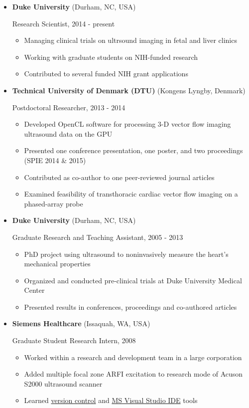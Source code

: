 \documentclass[
]{article}
\providecommand{\tightlist}{%
  \setlength{\itemsep}{0pt}\setlength{\parskip}{0pt}}
\begin{document}
\begin{itemize}
\item
  \textbf{Duke University} (Durham, NC, USA)

  Research Scientist, 2014 - present

  \begin{itemize}
  \tightlist
  \item
    Managing clinical trials on ultrsound imaging in fetal and liver
    clinics
  \item
    Working with graduate students on NIH-funded research
  \item
    Contributed to several funded NIH grant applications
  \end{itemize}
\item
  \textbf{Technical University of Denmark (DTU)} (Kongens Lyngby,
  Denmark)

  Postdoctoral Researcher, 2013 - 2014

  \begin{itemize}
  \tightlist
  \item
    Developed OpenCL software for processing 3-D vector flow imaging
    ultrasound data on the GPU
  \item
    Presented one conference presentation, one poster, and two
    proceedings (SPIE 2014 \& 2015)
  \item
    Contributed as co-author to one peer-reviewed journal articles
  \item
    Examined feasibility of transthoracic cardiac vector flow imaging on
    a phased-array probe
  \end{itemize}
\item
  \textbf{Duke University} (Durham, NC, USA)

  Graduate Research and Teaching Assistant, 2005 - 2013

  \begin{itemize}
  \tightlist
  \item
    PhD project using ultrasound to noninvasively measure the heart's
    mechanical properties
  \item
    Organized and conducted pre-clinical trials at Duke University
    Medical Center
  \item
    Presented results in conferences, proceedings and co-authored
    articles
  \end{itemize}
\item
  \textbf{Siemens Healthcare} (Issaquah, WA, USA)

  Graduate Student Research Intern, 2008

  \begin{itemize}
  \tightlist
  \item
    Worked within a research and development team in a large corporation
  \item
    Added multiple focal zone ARFI excitation to research mode of Acuson
    S2000 ultrasound scanner
  \item
    Learned
    \href{http://www-03.ibm.com/software/products/en/clearcase}{version
    control} and \href{http://www.visualstudio.com/}{MS Visual Studio
    IDE} tools
  \end{itemize}
\end{itemize}
\end{document}
